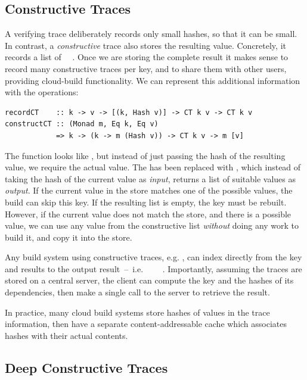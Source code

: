 \subsection{Constructive Traces}\label{sec-constructive-traces}

A verifying trace deliberately records only small hashes, so that it can be small.
In contrast, a \emph{constructive} trace also stores the resulting value. Concretely,
it records a list of ~~.
Once we are storing the complete result it makes sense
to record many constructive traces per key, and to share them with other users,
providing cloud-build functionality. We can represent this additional
information with the operations:

\begin{verbatim}
recordCT    :: k -> v -> [(k, Hash v)] -> CT k v -> CT k v
constructCT :: (Monad m, Eq k, Eq v)
            => k -> (k -> m (Hash v)) -> CT k v -> m [v]
\end{verbatim}

\noindent
The function  looks like , but instead of just passing
the hash of the resulting value, we require the actual value. The 
has been replaced with , which instead of taking the hash of the
current value as \emph{input}, returns a list of suitable values as \emph{output}.
If the current value in the store matches one of the possible values, the build
can skip this key. If the resulting list is empty, the key must be rebuilt.
However, if the current value does not match the store, and there is a possible
value, we can use any value from the constructive list \emph{without} doing any
work to build it, and copy it into the store.

Any  build system using constructive traces, e.g.
\CloudBuild, can index directly from the key and results to the output result~--~i.e.
~~\hs{[Hash}~\hs{v])}~. Importantly, assuming the traces
are stored on a central server, the client can compute the key and the hashes of
its dependencies, then make a single call to the server to retrieve the result.

In practice, many cloud build systems store hashes of values in the trace information,
then have a separate content-addressable cache which associates hashes with
their actual contents.

\subsection{Deep Constructive Traces}\label{sec-deep-constructive-traces}

